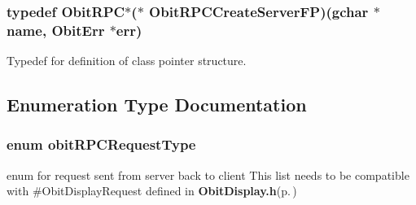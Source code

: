 \subsubsection{\setlength{\rightskip}{0pt plus 5cm}typedef {\bf Obit\-RPC}$\ast$($\ast$ {\bf Obit\-RPCCreate\-Server\-FP})(gchar $\ast$name, {\bf Obit\-Err} $\ast$err)}\label{ObitRPC_8h_a5}


Typedef for definition of class pointer structure. 



\subsection{Enumeration Type Documentation}
\subsubsection{\setlength{\rightskip}{0pt plus 5cm}enum {\bf obit\-RPCRequest\-Type}}\label{ObitRPC_8h_a27}


enum for request sent from server back to client This list needs to be compatible with \#Obit\-Display\-Request defined in {\bf Obit\-Display.h}{\rm (p.\,\pageref{ObitDisplay_8h})} 


